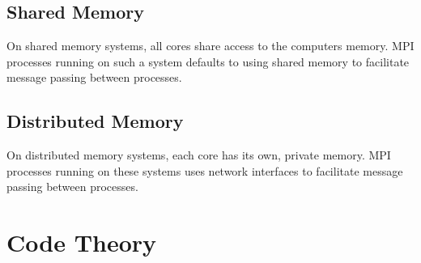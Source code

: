 \documentclass[paper=a4, fontsize=11pt]{scrartcl} %
\numberwithin{equation}{section} %
\numberwithin{figure}{section} %
\numberwithin{table}{section} %
\begin{document}
\subsection{Shared Memory}

On shared memory systems, all cores share access to the computers memory.
MPI processes running on such a system defaults to using shared memory to facilitate message passing between processes.

\subsection{Distributed Memory}

On distributed memory systems, each core has its own, private memory.
MPI processes running on these systems uses network interfaces to facilitate message passing between processes.

\section{Code Theory}



\end{document}
